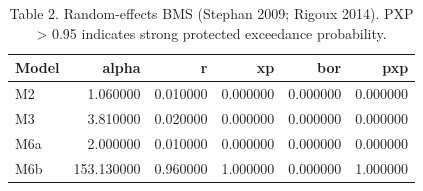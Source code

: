 \begin{table}[ht]
\centering
\caption{Table 2. Random-effects BMS (Stephan 2009; Rigoux 2014). PXP > 0.95 indicates strong protected exceedance probability.}
\label{tbl-rfx-bms}
\begin{tabular}{lrrrrr}
\toprule
Model & alpha & r & xp & bor & pxp \\
\midrule
M2 & 1.060000 & 0.010000 & 0.000000 & 0.000000 & 0.000000 \\
M3 & 3.810000 & 0.020000 & 0.000000 & 0.000000 & 0.000000 \\
M6a & 2.000000 & 0.010000 & 0.000000 & 0.000000 & 0.000000 \\
M6b & 153.130000 & 0.960000 & 1.000000 & 0.000000 & 1.000000 \\
\bottomrule
\end{tabular}
\end{table}
